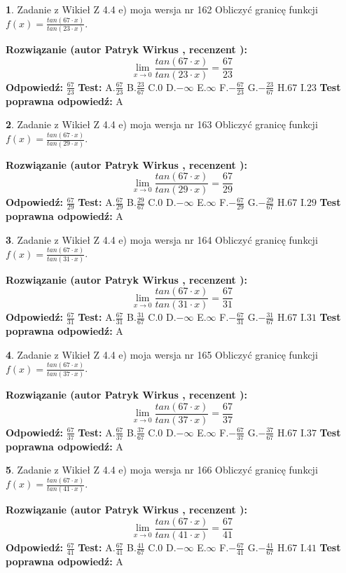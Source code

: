\documentclass[12pt, a4paper]{article}
\theoremstyle{definition} %
\newtheorem{zad}{}
\newcommand{\zadStart}[1]{\begin{zad}#1\newline}
\newcommand{\zadStop}{\end{zad}}
\newcommand{\rozwStart}[2]{\noindent \textbf{Rozwiązanie (autor #1 , recenzent #2): }\newline}
\newcommand{\rozwStop}{\newline}
\newcommand{\odpStart}{\noindent \textbf{Odpowiedź:}\newline}
\newcommand{\odpStop}{\newline}
\newcommand{\testStart}{\noindent \textbf{Test:}\newline}
\newcommand{\testStop}{\newline}
\newcommand{\kluczStart}{\noindent \textbf{Test poprawna odpowiedź:}\newline}
\newcommand{\kluczStop}{\newline}
\begin{document}
\zadStart{Zadanie z Wikieł Z 4.4 e) moja wersja nr 162}
Obliczyć granicę funkcji $f(x)=\frac{tan(67\cdot x)}{tan(23\cdot x)}$.
\zadStop
\rozwStart{Patryk Wirkus}{}
$$\lim\limits_{x\to 0}\frac{tan(67\cdot x)}{tan(23\cdot x)}=
\frac{67}{23}$$
\rozwStop
\odpStart
$\frac{67}{23}$
\odpStop
\testStart
A.$\frac{67}{23}$
B.$\frac{23}{67}$
C.$0$
D.$-\infty$
E.$\infty$
F.$-\frac{67}{23}$
G.$-\frac{23}{67}$
H.$67$
I.$23$
\testStop
\kluczStart
A
\kluczStop



\zadStart{Zadanie z Wikieł Z 4.4 e) moja wersja nr 163}
Obliczyć granicę funkcji $f(x)=\frac{tan(67\cdot x)}{tan(29\cdot x)}$.
\zadStop
\rozwStart{Patryk Wirkus}{}
$$\lim\limits_{x\to 0}\frac{tan(67\cdot x)}{tan(29\cdot x)}=
\frac{67}{29}$$
\rozwStop
\odpStart
$\frac{67}{29}$
\odpStop
\testStart
A.$\frac{67}{29}$
B.$\frac{29}{67}$
C.$0$
D.$-\infty$
E.$\infty$
F.$-\frac{67}{29}$
G.$-\frac{29}{67}$
H.$67$
I.$29$
\testStop
\kluczStart
A
\kluczStop



\zadStart{Zadanie z Wikieł Z 4.4 e) moja wersja nr 164}
Obliczyć granicę funkcji $f(x)=\frac{tan(67\cdot x)}{tan(31\cdot x)}$.
\zadStop
\rozwStart{Patryk Wirkus}{}
$$\lim\limits_{x\to 0}\frac{tan(67\cdot x)}{tan(31\cdot x)}=
\frac{67}{31}$$
\rozwStop
\odpStart
$\frac{67}{31}$
\odpStop
\testStart
A.$\frac{67}{31}$
B.$\frac{31}{67}$
C.$0$
D.$-\infty$
E.$\infty$
F.$-\frac{67}{31}$
G.$-\frac{31}{67}$
H.$67$
I.$31$
\testStop
\kluczStart
A
\kluczStop



\zadStart{Zadanie z Wikieł Z 4.4 e) moja wersja nr 165}
Obliczyć granicę funkcji $f(x)=\frac{tan(67\cdot x)}{tan(37\cdot x)}$.
\zadStop
\rozwStart{Patryk Wirkus}{}
$$\lim\limits_{x\to 0}\frac{tan(67\cdot x)}{tan(37\cdot x)}=
\frac{67}{37}$$
\rozwStop
\odpStart
$\frac{67}{37}$
\odpStop
\testStart
A.$\frac{67}{37}$
B.$\frac{37}{67}$
C.$0$
D.$-\infty$
E.$\infty$
F.$-\frac{67}{37}$
G.$-\frac{37}{67}$
H.$67$
I.$37$
\testStop
\kluczStart
A
\kluczStop



\zadStart{Zadanie z Wikieł Z 4.4 e) moja wersja nr 166}
Obliczyć granicę funkcji $f(x)=\frac{tan(67\cdot x)}{tan(41\cdot x)}$.
\zadStop
\rozwStart{Patryk Wirkus}{}
$$\lim\limits_{x\to 0}\frac{tan(67\cdot x)}{tan(41\cdot x)}=
\frac{67}{41}$$
\rozwStop
\odpStart
$\frac{67}{41}$
\odpStop
\testStart
A.$\frac{67}{41}$
B.$\frac{41}{67}$
C.$0$
D.$-\infty$
E.$\infty$
F.$-\frac{67}{41}$
G.$-\frac{41}{67}$
H.$67$
I.$41$
\testStop
\kluczStart
A
\kluczStop
\end{document}
